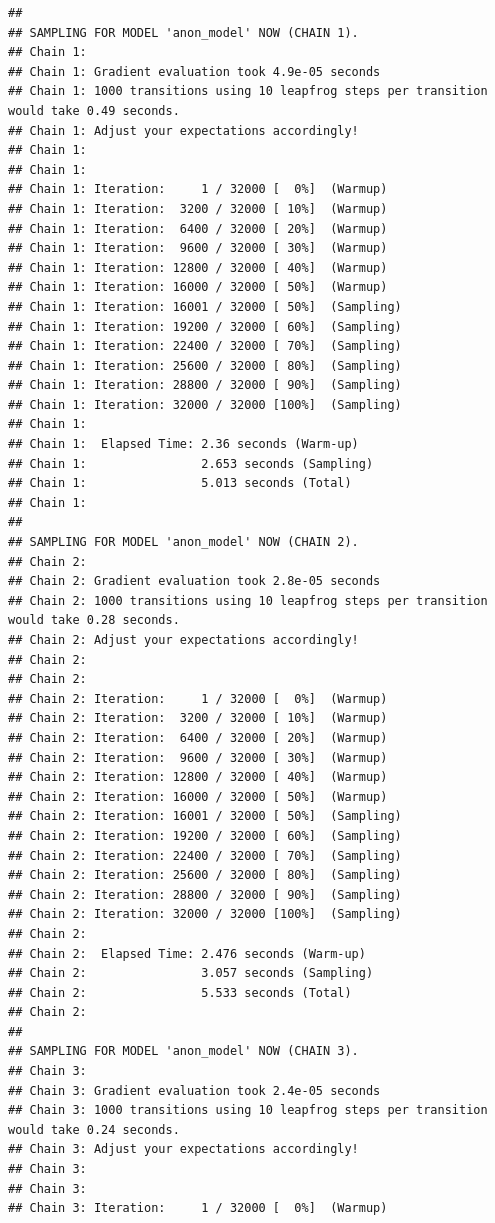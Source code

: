 \documentclass[
]{article}
\begin{document}
\begin{verbatim}
## 
## SAMPLING FOR MODEL 'anon_model' NOW (CHAIN 1).
## Chain 1: 
## Chain 1: Gradient evaluation took 4.9e-05 seconds
## Chain 1: 1000 transitions using 10 leapfrog steps per transition would take 0.49 seconds.
## Chain 1: Adjust your expectations accordingly!
## Chain 1: 
## Chain 1: 
## Chain 1: Iteration:     1 / 32000 [  0%]  (Warmup)
## Chain 1: Iteration:  3200 / 32000 [ 10%]  (Warmup)
## Chain 1: Iteration:  6400 / 32000 [ 20%]  (Warmup)
## Chain 1: Iteration:  9600 / 32000 [ 30%]  (Warmup)
## Chain 1: Iteration: 12800 / 32000 [ 40%]  (Warmup)
## Chain 1: Iteration: 16000 / 32000 [ 50%]  (Warmup)
## Chain 1: Iteration: 16001 / 32000 [ 50%]  (Sampling)
## Chain 1: Iteration: 19200 / 32000 [ 60%]  (Sampling)
## Chain 1: Iteration: 22400 / 32000 [ 70%]  (Sampling)
## Chain 1: Iteration: 25600 / 32000 [ 80%]  (Sampling)
## Chain 1: Iteration: 28800 / 32000 [ 90%]  (Sampling)
## Chain 1: Iteration: 32000 / 32000 [100%]  (Sampling)
## Chain 1: 
## Chain 1:  Elapsed Time: 2.36 seconds (Warm-up)
## Chain 1:                2.653 seconds (Sampling)
## Chain 1:                5.013 seconds (Total)
## Chain 1: 
## 
## SAMPLING FOR MODEL 'anon_model' NOW (CHAIN 2).
## Chain 2: 
## Chain 2: Gradient evaluation took 2.8e-05 seconds
## Chain 2: 1000 transitions using 10 leapfrog steps per transition would take 0.28 seconds.
## Chain 2: Adjust your expectations accordingly!
## Chain 2: 
## Chain 2: 
## Chain 2: Iteration:     1 / 32000 [  0%]  (Warmup)
## Chain 2: Iteration:  3200 / 32000 [ 10%]  (Warmup)
## Chain 2: Iteration:  6400 / 32000 [ 20%]  (Warmup)
## Chain 2: Iteration:  9600 / 32000 [ 30%]  (Warmup)
## Chain 2: Iteration: 12800 / 32000 [ 40%]  (Warmup)
## Chain 2: Iteration: 16000 / 32000 [ 50%]  (Warmup)
## Chain 2: Iteration: 16001 / 32000 [ 50%]  (Sampling)
## Chain 2: Iteration: 19200 / 32000 [ 60%]  (Sampling)
## Chain 2: Iteration: 22400 / 32000 [ 70%]  (Sampling)
## Chain 2: Iteration: 25600 / 32000 [ 80%]  (Sampling)
## Chain 2: Iteration: 28800 / 32000 [ 90%]  (Sampling)
## Chain 2: Iteration: 32000 / 32000 [100%]  (Sampling)
## Chain 2: 
## Chain 2:  Elapsed Time: 2.476 seconds (Warm-up)
## Chain 2:                3.057 seconds (Sampling)
## Chain 2:                5.533 seconds (Total)
## Chain 2: 
## 
## SAMPLING FOR MODEL 'anon_model' NOW (CHAIN 3).
## Chain 3: 
## Chain 3: Gradient evaluation took 2.4e-05 seconds
## Chain 3: 1000 transitions using 10 leapfrog steps per transition would take 0.24 seconds.
## Chain 3: Adjust your expectations accordingly!
## Chain 3: 
## Chain 3: 
## Chain 3: Iteration:     1 / 32000 [  0%]  (Warmup)

\end{verbatim}
\end{document}
